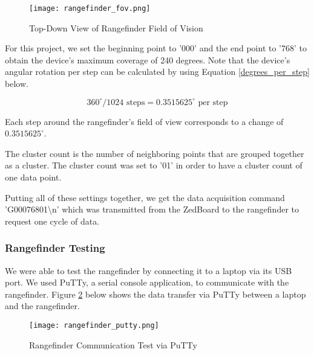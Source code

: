\begin{figure}[H]
	\centerline{\texttt{[image: rangefinder\_fov.png]}}
	\caption{Top-Down View of Rangefinder Field of Vision \cite{urg04lx_datasheet}}
	\label{rangefinder_fov}
\end{figure}

For this project, we set the beginning point to '000' and the end point to '768' to obtain the device's maximum coverage of 240 degrees. Note that the device's angular rotation per step can be calculated by using Equation \ref{degrees_per_step} below.

\begin{equation}
	360^\circ / 1024 \textrm{ steps}  = 0.3515625^\circ \textrm{ per step}
	\label{degrees_per_step}
\end{equation}

Each step around the rangefinder's field of view corresponds to a change of $0.3515625^\circ$.
\par
The cluster count is the number of neighboring points that are grouped together as a cluster. The cluster count was set to '01' in order to have a cluster count of one data point.
\par
Putting all of these settings together, we get the data acquisition command 'G00076801\textbackslash{}n' which was transmitted from the ZedBoard to the rangefinder to request one cycle of data.

\subsubsection{Rangefinder Testing}
We were able to test the rangefinder by connecting it to a laptop via its USB port. We used PuTTy, a serial console application, to communicate with the rangefinder. Figure \ref{rangefinder_putty} below shows the data transfer via PuTTy between a laptop and the rangefinder.

\begin{figure}[H]
	\centerline{\texttt{[image: rangefinder\_putty.png]}}
	\caption{Rangefinder Communication Test via PuTTy}
	\label{rangefinder_putty}
\end{figure}

